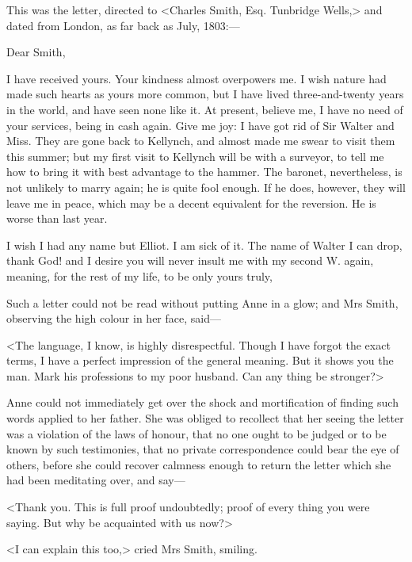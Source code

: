 This was the letter, directed to <Charles Smith, Esq. Tunbridge Wells,> and dated from London, as far back as July, 1803:—

\begin{mail}{}{Dear Smith,}

I have received yours. Your kindness almost overpowers me. I wish nature had made such hearts as yours more common, but I have lived three-and-twenty years in the world, and have seen none like it. At present, believe me, I have no need of your services, being in cash again. Give me joy: I have got rid of Sir Walter and Miss. They are gone back to Kellynch, and almost made me swear to visit them this summer; but my first visit to Kellynch will be with a surveyor, to tell me how to bring it with best advantage to the hammer. The baronet, nevertheless, is not unlikely to marry again; he is quite fool enough. If he does, however, they will leave me in peace, which may be a decent equivalent for the reversion. He is worse than last year.

I wish I had any name but Elliot. I am sick of it. The name of Walter I can drop, thank God! and I desire you will never insult me with my second W. again, meaning, for the rest of my life, to be only yours truly,

\end{mail}

Such a letter could not be read without putting Anne in a glow; and Mrs Smith, observing the high colour in her face, said—

<The language, I know, is highly disrespectful. Though I have forgot the exact terms, I have a perfect impression of the general meaning. But it shows you the man. Mark his professions to my poor husband. Can any thing be stronger?>

Anne could not immediately get over the shock and mortification of finding such words applied to her father. She was obliged to recollect that her seeing the letter was a violation of the laws of honour, that no one ought to be judged or to be known by such testimonies, that no private correspondence could bear the eye of others, before she could recover calmness enough to return the letter which she had been meditating over, and say—

<Thank you. This is full proof undoubtedly; proof of every thing you were saying. But why be acquainted with us now?>

<I can explain this too,> cried Mrs Smith, smiling.

